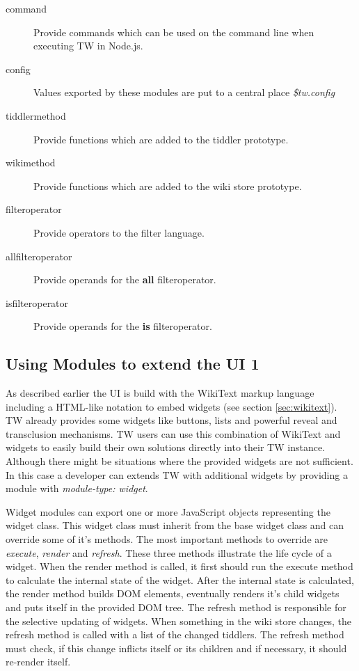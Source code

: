 \documentclass[12pt,a4paper]{scrartcl}
\begin{document}
\begin{description}
\item[command] Provide commands which can be used on the command line when executing TW in Node.js.
\item[config] Values exported by these modules are put to a central place \textit{\$tw.config}

\item[tiddlermethod] Provide functions which are added to the tiddler prototype.
\item[wikimethod] Provide functions which are added to the wiki store prototype.

\item[filteroperator] Provide operators to the filter language.
\item[allfilteroperator] Provide operands for the \textbf{all} filteroperator.
\item[isfilteroperator] Provide operands for the \textbf{is} filteroperator.
\end{description}

\subsection{Using Modules to extend the UI 1}

As described earlier the UI is build with the WikiText markup language including a HTML-like notation to embed widgets (see section \ref{sec:wikitext}).
TW already provides some widgets like buttons, lists and powerful reveal and transclusion mechanisms. TW users can use this combination of WikiText and widgets to easily build their own solutions directly into their TW instance. Although there might be situations where the provided widgets are not sufficient.
In this case a developer can extends TW with additional widgets by providing a module with \textit{module-type: widget}.

Widget modules can export one or more JavaScript objects representing the widget class.
This widget class must inherit from the base widget class and can override some of it's methods.
The most important methods to override are \textit{execute}, \textit{render} and \textit{refresh}.
These three methods illustrate the life cycle of a widget. When the render method is called, it first should run the execute method to calculate the internal state of the widget.
After the internal state is calculated, the render method builds DOM elements, eventually renders it's child widgets and puts itself in the provided DOM tree.
The refresh method is responsible for the selective updating of widgets. When something in the wiki store changes, the refresh method is called with a list of the changed tiddlers.
The refresh method must check, if this change inflicts itself or its children and if necessary, it should re-render itself.
\end{document}

